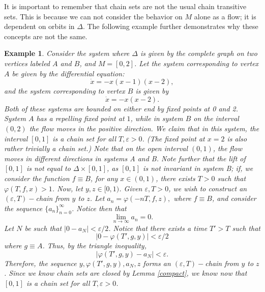 \documentclass[11pt]{article}
\newtheorem{ex}[thm]{Example}
\begin{document}
\indent It is important to remember that chain sets are not the usual chain transitive sets.
This is because we can not consider the behavior on $M$ alone as a flow; it is dependent on orbits in $\Delta$. The following example further demonstrates why these concepts are not the same.

\begin{ex}
Consider the system where $\Delta$ is given by the complete graph on two vertices labeled $A$ and $B$, and $M=[0,2]$.  Let the system corresponding to vertex $A$ be given by the differential equation:
$$\dot{x}=-x(x-1)(x-2),$$
and the system corresponding to vertex $B$ is given by 
$$\dot{x}=-x(x-2).$$
Both of these systems are bounded on either end by fixed points at 0 and 2.  System $A$ has a repelling fixed point at $1$, while in system $B$ on the interval $(0,2)$ the flow moves in the positive direction.  We claim that in this system, the interval $[0,1]$ is a chain set for all $T, \varepsilon>0$.  (The fixed point at $x=2$ is also rather trivially a chain set.) Note that on the open interval $(0,1)$, the flow moves in different directions in systems A and B.  Note further that the lift of $[0,1]$ is not equal to $\Delta\times [0,1]$, as $[0,1]$ is not invariant in system B; if, we consider the function $f\equiv B$, for any $x\in (0,1)$, there exists $T>0$ such that $\varphi(T,f,x)>1$.  Now, let $y,z\in [0,1)$.  Given $\varepsilon,T>0$, we wish to construct an $(\varepsilon,T)-$chain from $y$ to $z$.  Let $a_n=\varphi(-nT,f,z),$ where $f\equiv B$, and consider the sequence $\{a_n\}_{n=0}^\infty$. Notice then that 
$$\lim_{n\rightarrow\infty}a_n=0.$$
Let $N$ be such that $|0-a_N|<\varepsilon/2$. Notice that there exists a time $T'>T$ such that $$|0-\varphi(T',g,y)|<\varepsilon/2$$
where $g\equiv A$. Thus, by the triangle inequality, 
$$|\varphi(T',g,y)-a_N|<\varepsilon.$$
Therefore, the sequence $y, \varphi(T',g,y),a_N,z$ forms an $(\varepsilon,T)-$chain from $y$ to $z$.  Since we know chain sets are closed by Lemma \ref{compact}, we know now that $[0,1]$ is a chain set for all $T,\varepsilon>0$. \\

\end{ex}
\end{document}
